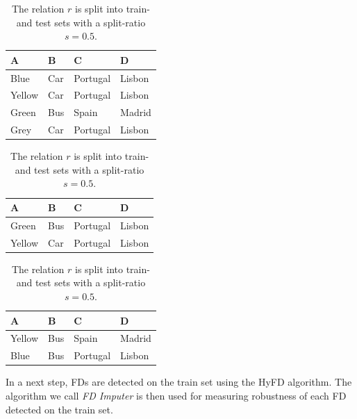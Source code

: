 \begin{table}[ht]
    \begin{subtable}[c]{0.9\textwidth}
        \centering
        \begin{tabular}{llll}
            \textsc{A} & \textsc{B} & \textsc{C} & \textsc{D} \\
        \toprule
        Blue & Car & Portugal & Lisbon \\
        Yellow & Car & Portugal & Lisbon  \\
        Green & Bus & Spain & Madrid  \\
        Grey & Car & Portugal & Lisbon  \\
        \bottomrule
        \end{tabular}
    \end{subtable}
    \begin{subtable}[c]{0.45\textwidth}
        \centering
        \begin{tabular}{llll}
            \textsc{A} & \textsc{B} & \textsc{C} & \textsc{D}  \\
        \toprule
            Green & Bus & Portugal & Lisbon \\
            Yellow & Car & Portugal & Lisbon \\
        \bottomrule
        \end{tabular}
    \end{subtable}
    \begin{subtable}[c]{0.45\textwidth}
        \centering
        \begin{tabular}{llll}
        \textsc{A} & \textsc{B} & \textsc{C} & \textsc{D} \\
        \toprule
        Yellow & Bus & Spain & Madrid \\
        Blue & Bus & Portugal & Lisbon \\
        \bottomrule
        \end{tabular}
    \end{subtable}
    \caption{The relation \( r \) is split into train- and test sets with a split-ratio \( s = 0.5 \). }
    \label{tab:split-example-fd-imputer}
\end{table}

In a next step, FDs are detected on the train set using the HyFD algorithm.\cite{PAP16}
The algorithm we call \emph{FD Imputer} is then used for measuring robustness of each FD detected on the train set.

